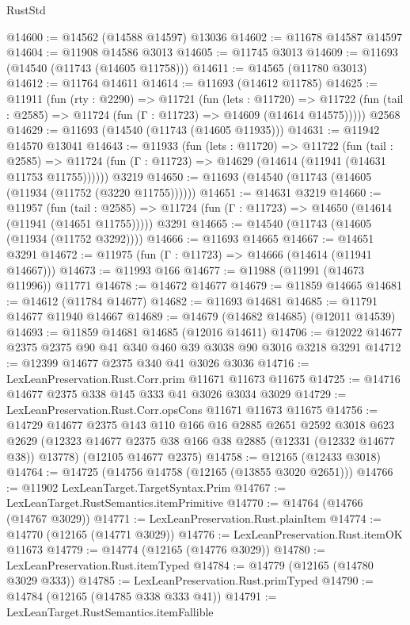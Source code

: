 \begin{lexlean}{RustStd}
\begin{coremodule}
@14600 := @14562 (@14588 @14597) @13036
@14602 := @11678 @14587 @14597
@14604 := @11908 @14586 @3013
@14605 := @11745 @3013
@14609 := @11693 (@14540 (@11743 (@14605 @11758)))
@14611 := @14565 (@11780 @3013)
@14612 := @11764 @14611
@14614 := @11693 (@14612 @11785)
@14625 := @11911
    (fun (rty : @2290) =>
    @11721
      (fun (lets : @11720) =>
      @11722 (fun (tail : @2585) => @11724 (fun (Γ : @11723) => @14609 (@14614 @14575)))))
    @2568
@14629 := @11693 (@14540 (@11743 (@14605 @11935)))
@14631 := @11942 @14570 @13041
@14643 := @11933
    (fun (lets : @11720) =>
    @11722
      (fun (tail : @2585) =>
      @11724 (fun (Γ : @11723) => @14629 (@14614 (@11941 (@14631 @11753 @11755))))))
    @3219
@14650 := @11693 (@14540 (@11743 (@14605 (@11934 (@11752 (@3220 @11755))))))
@14651 := @14631 @3219
@14660 := @11957
    (fun (tail : @2585) => @11724 (fun (Γ : @11723) => @14650 (@14614 (@11941 (@14651 @11755)))))
    @3291
@14665 := @14540 (@11743 (@14605 (@11934 (@11752 @3292))))
@14666 := @11693 @14665
@14667 := @14651 @3291
@14672 := @11975 (fun (Γ : @11723) => @14666 (@14614 (@11941 @14667)))
@14673 := @11993 @166
@14677 := @11988 (@11991 (@14673 @11996)) @11771
@14678 := @14672 @14677
@14679 := @11859 @14665
@14681 := @14612 (@11784 @14677)
@14682 := @11693 @14681
@14685 := @11791 @14677 @11940 @14667
@14689 := @14679 (@14682 @14685) (@12011 @14539)
@14693 := @11859 @14681 @14685 (@12016 @14611)
@14706 := @12022 @14677 @2375 @2375 @90 @41 @340 @460 @39 @3038 @90 @3016 @3218 @3291
@14712 := @12399 @14677 @2375 @340 @41 @3026 @3036
@14716 := LexLeanPreservation.Rust.Corr.prim @11671 @11673 @11675
@14725 := @14716 @14677 @2375 @338 @145 @333 @41 @3026 @3034 @3029
@14729 := LexLeanPreservation.Rust.Corr.opsCons @11671 @11673 @11675
@14756 := @14729
    @14677
    @2375
    @143
    @110
    @166
    @16
    @2885
    @2651
    @2592
    @3018
    @623
    @2629
    (@12323 @14677 @2375 @38 @166 @38 @2885 (@12331 (@12332 @14677 @38)) @13778)
    (@12105 @14677 @2375)
@14758 := @12165 (@12433 @3018)
@14764 := @14725 (@14756 @14758 (@12165 (@13855 @3020 @2651)))
@14766 := @11902 LexLeanTarget.TargetSyntax.Prim
@14767 := LexLeanTarget.RustSemantics.itemPrimitive
@14770 := @14764 (@14766 (@14767 @3029))
@14771 := LexLeanPreservation.Rust.plainItem
@14774 := @14770 (@12165 (@14771 @3029))
@14776 := LexLeanPreservation.Rust.itemOK @11673
@14779 := @14774 (@12165 (@14776 @3029))
@14780 := LexLeanPreservation.Rust.itemTyped
@14784 := @14779 (@12165 (@14780 @3029 @333))
@14785 := LexLeanPreservation.Rust.primTyped
@14790 := @14784 (@12165 (@14785 @338 @333 @41))
@14791 := LexLeanTarget.RustSemantics.itemFallible

\end{coremodule}
\end{lexlean}
